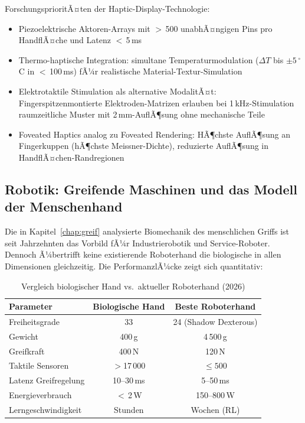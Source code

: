﻿\documentclass[12pt,a4paper]{report}
\theoremstyle{plain}
\theoremstyle{definition}
\theoremstyle{remark}
\begin{document}
ForschungsprioritÃ¤ten der Haptic-Display-Technologie:
\begin{itemize}
\item Piezoelektrische Aktoren-Arrays mit $>$\,500 unabhÃ¤ngigen Pins
  pro HandflÃ¤che und Latenz $<$\,5\,ms
\item Thermo-haptische Integration: simultane Temperaturmodulation
  ($\Delta T$ bis $\pm 5\,^{\circ}$C in $<$\,100\,ms) fÃ¼r realistische
  Material-Textur-Simulation
\item Elektrotaktile Stimulation als alternative ModalitÃ¤t:
  Fingerspitzenmontierte Elektro\-den-Matrizen erlauben bei 1\,kHz-Stimulation
  raumzeitliche Muster mit 2\,mm-AuflÃ¶sung ohne mechanische Teile
\item Foveated Haptics analog zu Foveated Rendering: HÃ¶chste AuflÃ¶sung
  an Fingerkuppen (hÃ¶chste Meissner-Dichte), reduzierte AuflÃ¶sung in
  HandflÃ¤chen-Randregionen
\end{itemize}

\subsection{Robotik: Greifende Maschinen und das Modell der Menschenhand}

Die in Kapitel~\ref{chap:greif} analysierte Biomechanik des menschlichen
Griffs ist seit Jahrzehnten das Vorbild fÃ¼r Industrierobotik und
Service-Roboter. Dennoch Ã¼bertrifft keine existierende Roboterhand
die biologische in allen Dimensionen gleichzeitig. Die PerformanzlÃ¼cke
zeigt sich quantitativ:

\begin{table}[ht]
\centering
\caption{Vergleich biologischer Hand vs.\ aktueller Roboterhand (2026)}
\begin{tabular}{lcc}
\toprule
\textbf{Parameter} & \textbf{Biologische Hand} & \textbf{Beste Roboterhand} \\
\midrule
Freiheitsgrade      & 33              & 24 (Shadow Dexterous) \\
Gewicht             & 400\,g          & 4\,500\,g \\
Greifkraft          & 400\,N          & 120\,N \\
Taktile Sensoren    & $>$17\,000      & $\leq 500$ \\
Latenz Greifregelung & 10--30\,ms     & 5--50\,ms \\
Energieverbrauch    & $<$\,2\,W       & 150--800\,W \\
Lerngeschwindigkeit & Stunden         & Wochen (RL) \\
\bottomrule
\end{tabular}
\label{tab:hand_vs_robot}
\end{table}
\end{document}
